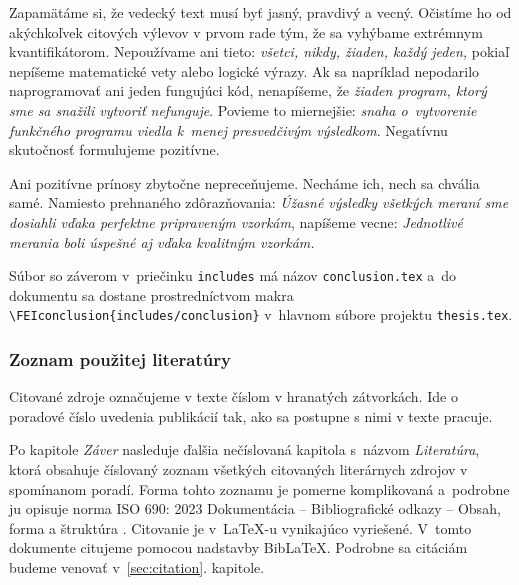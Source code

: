 \documentclass[../../../thesis.tex]{subfiles}
\begin{document}
Zapamätáme si, že vedecký text musí byť jasný, pravdivý a vecný.
Očistíme ho od akýchkoľvek citových výlevov v prvom rade tým,
že sa vyhýbame extrémnym kvantifikátorom. Nepoužívame ani tieto:
\emph{všetci, nikdy, žiaden, každý jeden,}
pokiaľ nepíšeme matematické vety alebo logické výrazy.
Ak sa napríklad nepodarilo naprogramovať ani jeden fungujúci kód,
nenapíšeme,
že \emph{žiaden program, ktorý sme sa snažili vytvoriť nefunguje}.
Povieme to miernejšie: \emph{snaha o~vytvorenie funkčného
programu viedla k~menej presvedčivým výsledkom}.
Negatívnu skutočnosť formulujeme pozitívne.

Ani pozitívne prínosy zbytočne nepreceňujeme.
Necháme ich, nech sa chvália samé.
Namiesto prehnaného zdôrazňovania:
\emph{Úžasné výsledky všetkých meraní sme dosiahli
vďaka perfektne pripraveným vzorkám},
napíšeme vecne:
\emph{Jednotlivé merania boli úspešné aj
vďaka kvalitným vzorkám.}

Súbor so záverom v~priečinku \verb|includes| má
názov \verb|conclusion.tex|
a~do dokumentu sa dostane prostredníctvom makra
\verb|\FEIconclusion{includes/conclusion}|
v~hlavnom súbore projektu \verb|thesis.tex|.

\subsubsection{Zoznam použitej literatúry}
Citované zdroje označujeme v texte číslom v hranatých zátvorkách. Ide o poradové číslo uvedenia publikácií tak, ako sa postupne s nimi v texte pracuje.

Po kapitole \emph{Záver} nasleduje ďalšia nečíslovaná kapitola
s~názvom \emph{Literatúra},
ktorá obsahuje číslovaný zoznam všetkých
citovaných literárnych zdrojov v spomínanom poradí.
Forma tohto zoznamu je pomerne komplikovaná a~podrobne
ju opisuje norma ISO 690: 2023 Dokumentácia -- Bibliografické odkazy -- Obsah, forma a štruktúra \cite{iso690}.
Citovanie je v~\LaTeX-u vynikajúco vyriešené.
V~tomto dokumente citujeme pomocou nadstavby Bib\LaTeX.
Podrobne sa citáciám budeme venovať v~\ref{sec:citation}. kapitole.
\end{document}
